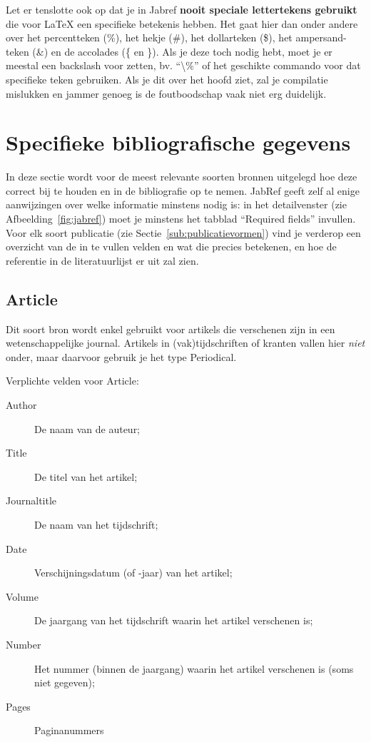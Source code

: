 Let er tenslotte ook op dat je in Jabref \textbf{nooit speciale lettertekens gebruikt} die voor {\LaTeX} een specifieke betekenis hebben. Het gaat hier dan onder andere over het percentteken (\%), het hekje (\#), het dollarteken (\$), het ampersand-teken (\&) en de accolades (\{ en \}). Als je deze toch nodig hebt, moet je er meestal een backslash voor zetten, bv. ``\textbackslash\%'' of het geschikte commando voor dat specifieke teken gebruiken. Als je dit over het hoofd ziet, zal je compilatie mislukken en jammer genoeg is de foutboodschap vaak niet erg duidelijk.

\section{Specifieke bibliografische gegevens}%
\label{sec:specifieke_bibliografische_gegevens}

In deze sectie wordt voor de meest relevante soorten bronnen uitgelegd hoe deze correct bij te houden en in de bibliografie op te nemen. JabRef geeft zelf al enige aanwijzingen over welke informatie minstens nodig is: in het detailvenster (zie Afbeelding~\ref{fig:jabref}) moet je minstens het tabblad ``Required fields'' invullen. Voor elk soort publicatie (zie Sectie~\ref{sub:publicatievormen}) vind je verderop een overzicht van de in te vullen velden en wat die precies betekenen, en hoe de referentie in de literatuurlijst er uit zal zien.

\subsection{Article}%
\label{ssec:article}

Dit soort bron wordt enkel gebruikt voor artikels die verschenen zijn in een wetenschappelijke journal. Artikels in (vak)tijdschriften of kranten vallen hier \emph{niet} onder, maar daarvoor gebruik je het type Periodical.

Verplichte velden voor Article:

\begin{description}
  \item[Author] De naam van de auteur;
  \item[Title] De titel van het artikel;
  \item[Journaltitle] De naam van het tijdschrift;
  \item[Date] Verschijningsdatum (of -jaar) van het artikel;
  \item[Volume] De jaargang van het tijdschrift waarin het artikel verschenen is;
  \item[Number] Het nummer (binnen de jaargang) waarin het artikel verschenen is (soms niet gegeven);
  \item[Pages] Paginanummers
\end{description}


